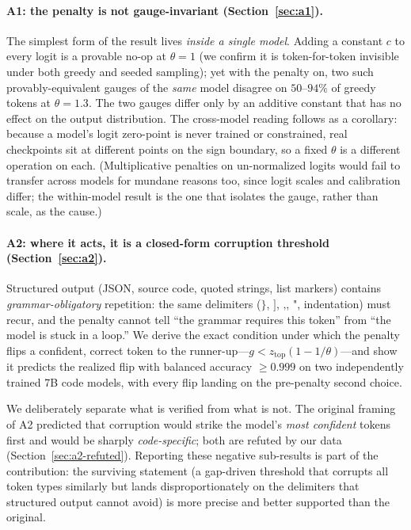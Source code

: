\documentclass[11pt]{article}
\newcommand{\ztop}{z_{\mathrm{top}}}
\newcommand{\thp}{\theta}
\newcommand{\code}[1]{\texttt{#1}}
\begin{document}
\paragraph{A1: the penalty is not gauge-invariant (Section~\ref{sec:a1}).} The simplest
form of the result lives \emph{inside a single model}. Adding a constant $c$ to
every logit is a provable no-op at $\thp=1$ (we confirm it is token-for-token invisible under
both greedy and seeded sampling); yet with the penalty on, two such provably-equivalent gauges
of the \emph{same} model disagree on $50$--$94\%$ of greedy tokens at $\thp=1.3$. The two gauges
differ only by an additive constant that has no effect on the output distribution. The cross-model reading
follows as a corollary: because a model's logit zero-point is never trained or constrained, real
checkpoints sit at different points on the sign boundary, so a fixed $\thp$ is a different
operation on each. (Multiplicative penalties on un-normalized logits would fail to transfer
across models for mundane reasons too, since logit scales and calibration differ; the
within-model result is the one that isolates the gauge, rather than scale, as the cause.)

\paragraph{A2: where it acts, it is a closed-form corruption threshold
(Section~\ref{sec:a2}).} Structured output (JSON, source code, quoted strings, list
markers) contains \emph{grammar-obligatory} repetition: the same delimiters
($\code{\}}$, $\code{]}$, $\code{,}$, $\code{"}$, indentation) must recur, and the penalty
cannot tell ``the grammar requires this token'' from ``the model is stuck in a loop.'' We
derive the exact condition under which the penalty flips a confident, correct token to the
runner-up---$g < \ztop(1-1/\thp)$---and show it predicts the realized flip with
balanced accuracy $\ge 0.999$ on two independently trained 7B code models, with every flip
landing on the pre-penalty second choice.

We deliberately separate what is verified from what is not. The original framing of A2
predicted that corruption would strike the model's \emph{most confident} tokens first and
would be sharply \emph{code-specific}; both are refuted by our data
(Section~\ref{sec:a2-refuted}). Reporting these negative sub-results is part of the
contribution: the surviving statement (a gap-driven threshold that corrupts all token types
similarly but lands disproportionately on the delimiters that structured output cannot avoid) is
more precise and better supported than the original.
\end{document}
